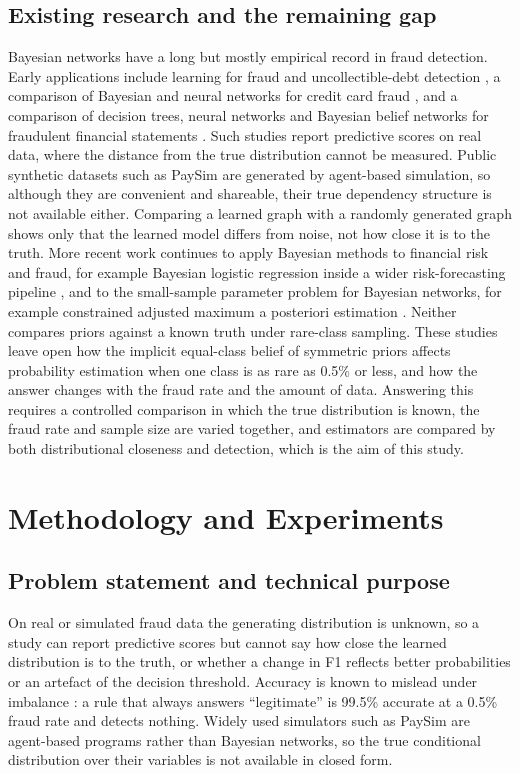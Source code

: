 \documentclass[final,5p,times,authoryear]{elsarticle}
\begin{document}
\subsection{Existing research and the remaining gap}
Bayesian networks have a long but mostly empirical record in fraud detection. Early applications include learning for fraud and uncollectible-debt detection \citep{ezawa1995}, a comparison of Bayesian and neural networks for credit card fraud \citep{maes2002}, and a comparison of decision trees, neural networks and Bayesian belief networks for fraudulent financial statements \citep{kirkos2007}. Such studies report predictive scores on real data, where the distance from the true distribution cannot be measured. Public synthetic datasets such as PaySim \citep{lopez2016} are generated by agent-based simulation, so although they are convenient and shareable, their true dependency structure is not available either. Comparing a learned graph with a randomly generated graph shows only that the learned model differs from noise, not how close it is to the truth. More recent work continues to apply Bayesian methods to financial risk and fraud, for example Bayesian logistic regression inside a wider risk-forecasting pipeline \citep{almamun2025}, and to the small-sample parameter problem for Bayesian networks, for example constrained adjusted maximum a posteriori estimation \citep{camap2021}. Neither compares priors against a known truth under rare-class sampling. These studies leave open how the implicit equal-class belief of symmetric priors affects probability estimation when one class is as rare as 0.5\% or less, and how the answer changes with the fraud rate and the amount of data. Answering this requires a controlled comparison in which the true distribution is known, the fraud rate and sample size are varied together, and estimators are compared by both distributional closeness and detection, which is the aim of this study.

\section{Methodology and Experiments}
\subsection{Problem statement and technical purpose}\label{sec:problem}
On real or simulated fraud data the generating distribution is unknown, so a study can report predictive scores but cannot say how close the learned distribution is to the truth, or whether a change in F1 reflects better probabilities or an artefact of the decision threshold. Accuracy is known to mislead under imbalance \citep{he2009,saito2015}: a rule that always answers ``legitimate'' is 99.5\% accurate at a 0.5\% fraud rate and detects nothing. Widely used simulators such as PaySim \citep{lopez2016} are agent-based programs rather than Bayesian networks, so the true conditional distribution over their variables is not available in closed form.
\end{document}
